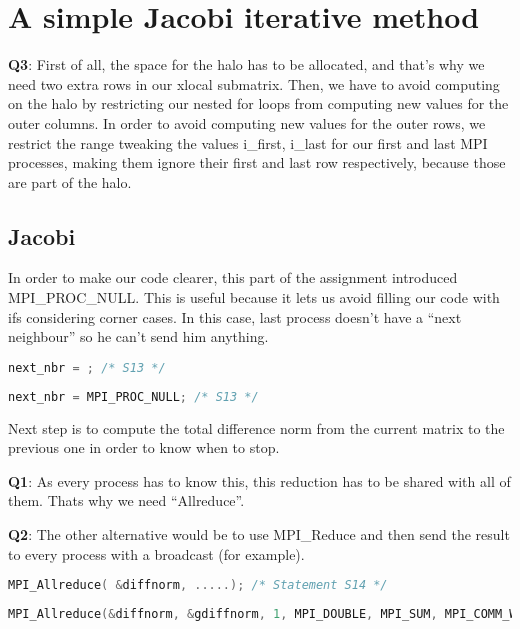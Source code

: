\documentclass[a4paper, 10pt]{article}
\begin{document}
\section{A simple Jacobi iterative method}

\textbf{Q3}: First of all, the space for the halo has to be allocated, and that's why we need two extra rows in our xlocal submatrix. Then, we have to avoid computing on the halo by restricting our nested for loops from computing new values for the outer columns. In order to avoid computing new values for the outer rows, we restrict the range tweaking the values i\_first, i\_{last} for our first and last MPI processes, making them ignore their first and last row respectively, because those are part of the halo. 

\subsection{Jacobi}
    In order to make our code clearer, this part of the assignment introduced MPI\_PROC\_NULL. This is useful because it lets us avoid filling our code with ifs considering corner cases. In this case, last process doesn't have a ``next neighbour'' so he can't send him anything. 
    \begin{lstlisting}[language=c, caption={Template S13}]
next_nbr = ; /* S13 */
    \end{lstlisting}

    \begin{lstlisting}[language=c, caption={Correct S13}]
next_nbr = MPI_PROC_NULL; /* S13 */
    \end{lstlisting}


Next step is to compute the total difference norm from the current matrix to the previous one in order to know when to stop. 

\textbf{Q1}: As every process has to know this, this reduction has to be shared with all of them. Thats why we need ``Allreduce''. 

\textbf{Q2}: The other alternative would be to use MPI\_Reduce and then send the result to every process with a broadcast (for example).
    \begin{lstlisting}[language=c, caption={Template S14}]
MPI_Allreduce( &diffnorm, .....); /* Statement S14 */
    \end{lstlisting}

    \begin{lstlisting}[language=c, caption={Correct S14}]
MPI_Allreduce(&diffnorm, &gdiffnorm, 1, MPI_DOUBLE, MPI_SUM, MPI_COMM_WORLD); /* S14 */
    \end{lstlisting}
\end{document}
